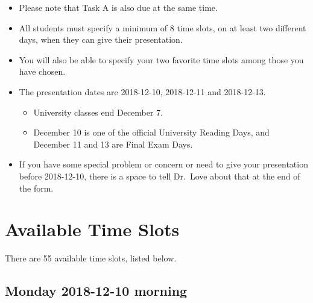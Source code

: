 \documentclass[]{book}
\providecommand{\tightlist}{%
  \setlength{\itemsep}{0pt}\setlength{\parskip}{0pt}}
\theoremstyle{definition}
\theoremstyle{definition}
\theoremstyle{definition}
\theoremstyle{remark}
\begin{document}
\begin{itemize}
\item
  Please note that Task A is also due at the same time.
\item
  All students must specify a minimum of 8 time slots, on at least two
  different days, when they can give their presentation.
\item
  You will also be able to specify your two favorite time slots among
  those you have chosen.
\item
  The presentation dates are 2018-12-10, 2018-12-11 and 2018-12-13.

  \begin{itemize}
  \tightlist
  \item
    University classes end December 7.
  \item
    December 10 is one of the official University Reading Days, and
    December 11 and 13 are Final Exam Days.
  \end{itemize}
\item
  If you have some special problem or concern or need to give your
  presentation before 2018-12-10, there is a space to tell Dr.~Love
  about that at the end of the form.
\end{itemize}

\hypertarget{available-time-slots}{%
\section{Available Time Slots}\label{available-time-slots}}

There are 55 available time slots, listed below.

\hypertarget{monday-2018-12-10-morning}{%
\subsection{Monday 2018-12-10 morning}\label{monday-2018-12-10-morning}}
\end{document}
